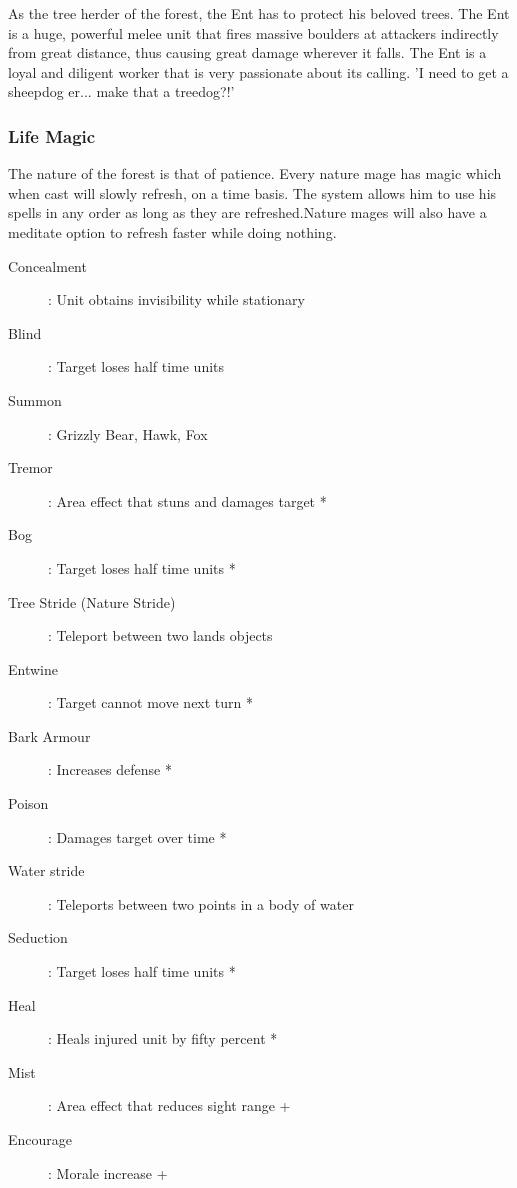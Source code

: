 \documentclass[a4paper,twocolumn]{article}
\begin{document}
As the tree herder of the forest, the Ent has to protect his beloved trees.  The Ent is a huge, powerful melee unit that fires massive boulders at attackers indirectly from great distance,  thus causing great damage wherever it falls. The Ent is a loyal and diligent worker that is very passionate about its calling. 'I need to get a sheepdog er... make that a treedog?!'

\subsubsection{Life Magic}

The nature of the forest is that of patience. Every nature mage has magic which when cast will slowly refresh, on a time basis. The system allows him to use his spells in any order as long as they are refreshed.Nature mages will also have a meditate option to refresh faster while doing nothing.

\begin{description}
\item[Concealment]: Unit obtains invisibility while stationary
\item[Blind]: Target loses half time units
\end{description}

\begin{description}
\item[Summon]: Grizzly Bear, Hawk, Fox
\item[Tremor]: Area effect that stuns and damages target *
\item[Bog]: Target loses half time units *
\end{description}

\begin{description}
\item[Tree Stride (Nature Stride)]: Teleport between two lands objects
\item[Entwine]: Target cannot move next turn *
\item[Bark Armour]: Increases defense *
\item[Poison]: Damages target over time * 
\end{description}

\begin{description}
\item[Water stride]: Teleports between two points in a body of water
\item[Seduction]: Target loses half time units *
\item[Heal]: Heals injured unit by fifty percent *
\item[Mist]: Area effect that reduces sight range +
\item[Encourage]: Morale increase +
\end{description}
\end{document}
